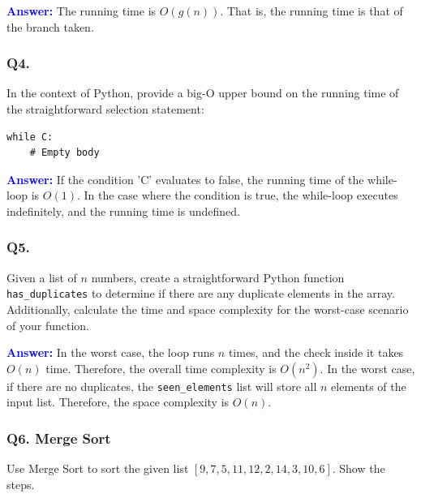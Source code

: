 \textcolor{blue}{\textbf{Answer:}} The running time is $O(g(n))$. That is, the running time is that of the branch taken.

\subsubsection{Q4.}
In the context of Python, provide a big-O upper bound on the running time of the straightforward selection statement:

\begin{lstlisting}[frame=single]
while C:
    # Empty body
\end{lstlisting}

\textcolor{blue}{\textbf{Answer:}} If the condition 'C' evaluates to false, the running time of the while-loop is $O(1)$. In the case where the condition is true, the while-loop executes indefinitely, and the running time is undefined.

\subsubsection{Q5.}
Given a list of $n$ numbers, create a straightforward Python function \texttt{has\_duplicates} to determine if there are any duplicate elements in the array. Additionally, calculate the time and space complexity for the worst-case scenario of your function.

\textcolor{blue}{\textbf{Answer:}} In the worst case, the loop runs $n$ times, and the check inside it takes $O(n)$ time. Therefore, the overall time complexity is $O(n^2)$. In the worst case, if there are no duplicates, the \texttt{seen\_elements} list will store all $n$ elements of the input list. Therefore, the space complexity is $O(n)$.

\subsubsection{Q6. Merge Sort}
Use Merge Sort to sort the given list $[9, 7, 5, 11, 12, 2, 14, 3, 10, 6]$. Show the steps.\\



